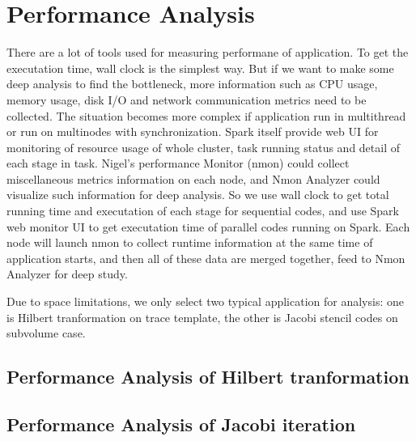 \section{Performance Analysis}
There are a lot of tools used for measuring performane of application. To get the executation time, wall clock is the simplest way. But if we want to make some deep analysis to find the bottleneck, more information such as CPU usage, memory usage, disk I/O and network communication metrics need to be collected. The situation becomes more complex if application run in multithread or run on multinodes with synchronization. Spark itself provide web UI for monitoring of resource usage of whole cluster, task running status and detail of each stage in task. Nigel's performance Monitor (nmon) could collect miscellaneous metrics information on each node, and Nmon Analyzer could visualize such information for deep analysis. So we use wall clock to get total running time and executation of each stage for sequential codes, and use Spark web monitor UI to get executation time of parallel codes running on Spark. Each node will launch nmon to collect runtime information at the same time of application starts, and then all of these data are merged together, feed to Nmon Analyzer for deep study. 
 
Due to space limitations, we only select two typical application for analysis: one is Hilbert tranformation on trace template, the other is Jacobi stencil codes on subvolume case.

\subsection{Performance Analysis of Hilbert tranformation}
 

\subsection{Performance Analysis of Jacobi iteration}




